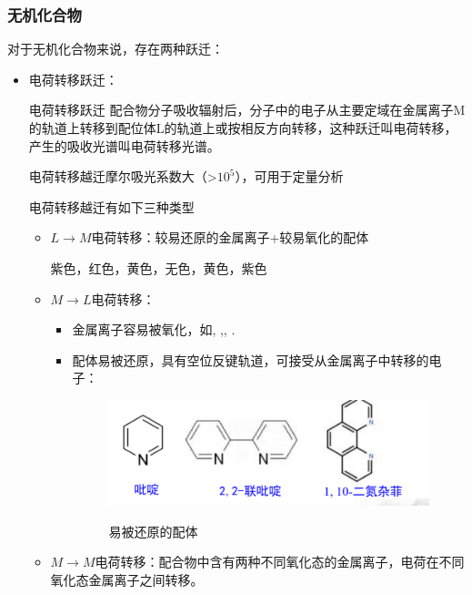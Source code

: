 \subsubsection*{无机化合物}
对于无机化合物来说，存在两种跃迁：
\begin{itemize}
    \item 电荷转移跃迁：
    \begin{definition*}{电荷转移跃迁}
        配合物分子吸收辐射后，分子中的电子从主要定域在金属离子M的轨道上转移到配位体L的轨道上或按相反方向转移，这种跃迁叫电荷转移，产生的吸收光谱叫电荷转移光谱。
    \end{definition*}
    \begin{note}
        电荷转移越迁摩尔吸光系数大（>$10^{5}$），可用于定量分析
    \end{note}
    电荷转移越迁有如下三种类型
    \begin{itemize}
        \item $L\rightarrow M$电荷转移：较易还原的金属离子+较易氧化的配体
        \begin{example}
             紫色，红色，黄色，无色，黄色，紫色
        \end{example}
        \item $M\rightarrow L$电荷转移：
        \begin{itemize}
            \item 金属离子容易被氧化，如, ,, .
            \item 配体易被还原，具有空位反键轨道，可接受从金属离子中转移的电子：
            \begin{figure}[h]
                \centering
                \includegraphics[width=10cm]{image/chp3_L.png}
                \label{fig:chp3L}
                \caption{易被还原的配体}
            \end{figure}
        \end{itemize}
        \item $M\rightarrow M$电荷转移：配合物中含有两种不同氧化态的金属离子，电荷在不同氧化态金属离子之间转移。
        \begin{figure}[h]

\end{figure}
\end{itemize}
\end{itemize}
